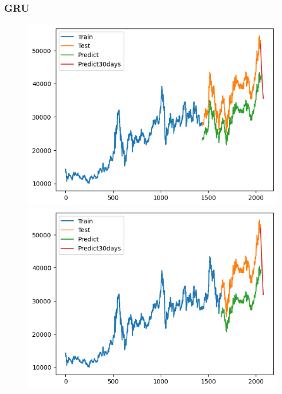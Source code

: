 \subsubsection{GRU}
\begin{figure}[H]
    \centering
    \begin{minipage}{0.15\textwidth}
    \centering
    \includegraphics[width=1\textwidth]{resources/chapter-5/result/BIDV_GRU_7-3.png}
    \end{minipage}
    \hfill
    \begin{minipage}{0.15\textwidth}
    \centering
    \includegraphics[width=1\textwidth]{resources/chapter-5/result/BIDV_GRU_8-2.png}
    \end{minipage}
    \hfill
        \begin{minipage}{0.15\textwidth}

\end{minipage}
\end{figure}
